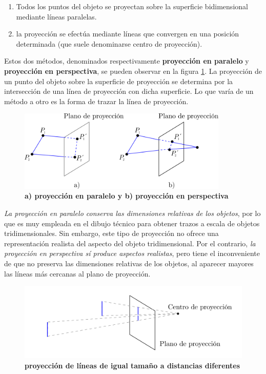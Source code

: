 \begin{enumerate}
    \item Todos los puntos del objeto se proyectan sobre la superficie bidimensional mediante líneas paralelas.
    
    \item la proyección se efectúa mediante líneas que convergen en una posición determinada (que suele denominarse centro de proyección).
\end{enumerate}
Estos dos métodos, denominados respectivamente \textbf{proyección en paralelo} y \textbf{proyección en perspectiva}, se pueden observar en la figura \ref{geo-per0}. La proyección de un punto del objeto sobre la superficie de proyección se determina por la intersección de una línea de proyección con dicha superficie. Lo que varía de un método a otro es la forma de trazar la línea de proyección.
\vspace{5mm}
\begin{figure}[h]
    \includegraphics[width=10cm]{Img/GEO/geo-per-0.png}
    \centering
    \caption{\footnotesize{\textbf{a) proyección en paralelo y b) proyección en perspectiva}}}
    \label{geo-per0}
\end{figure}

\textit{La proyección en paralelo conserva las dimensiones relativas de los objetos}, por lo que es muy empleada en el dibujo técnico para obtener trazos a escala de objetos tridimensionales. Sin embargo, este tipo de proyección no ofrece una representación realista del aspecto del objeto tridimensional. Por el contrario, \textit{la proyección en perspectiva sí produce aspectos realistas}, pero tiene el inconveniente de que no preserva las dimensiones relativas de los objetos, al aparecer mayores las líneas más cercanas al plano de proyección.

\begin{figure}[h]
    \includegraphics[width=12cm]{Img/GEO/geo-per-1.png}
    \centering
    \caption{\footnotesize{\textbf{proyección de líneas de igual tamaño a distancias diferentes}}}
    \label{geo-per1}
\end{figure}

